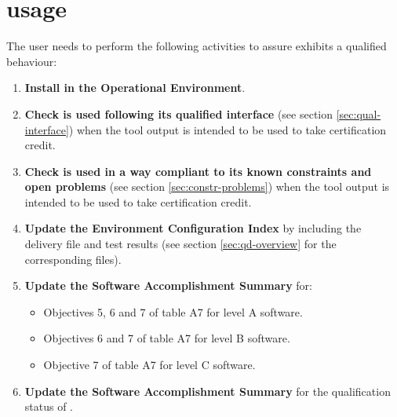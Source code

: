 \documentclass {report}
\begin{document}
\section{\xcov{} usage}
The user needs to perform the following activities to assure \xcov{} exhibits a qualified behaviour:
\begin{enumerate}
\item \textbf{Install \xcov{} in the Operational Environment}.
\item \textbf{Check \xcov{} is used following its qualified interface} (see section \ref{sec:qual-interface}) when the tool output is intended to be used to take certification credit.
\item \textbf{Check \xcov{} is used in a way compliant to its known constraints and open problems} (see section \ref{sec:constr-problems}) when the tool output is intended to be used to take certification credit.
\item \textbf{Update the Environment Configuration Index} by including the delivery file and test results (see section \ref{sec:qd-overview} for the corresponding files).
\item \textbf{Update the Software Accomplishment Summary} for:
\begin{itemize}
\item Objectives 5, 6 and 7 of table A7 for level A software.
\item Objectives 6 and 7 of table A7 for level B software.
\item Objective 7 of table A7 for level C software.
\end{itemize}
\item \textbf{Update the Software Accomplishment Summary} for the qualification status of \xcov{}.
\end{enumerate}
\end{document}
